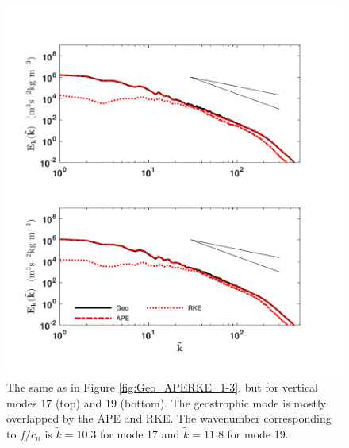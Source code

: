 \begin{figure}[H]
\includegraphics[scale=1]{Chapter4/img/Geo_APERKE_17-19}
\caption{The same as in Figure \ref{fig:Geo_APERKE_1-3}, but for vertical modes 17 (top) and 19 (bottom). The geostrophic mode is mostly overlapped by the APE and RKE. The wavenumber corresponding to $f/c_n$ is $\tilde{k} = 10.3$ for mode 17 and $\tilde{k} = 11.8$ for mode 19.}
\label{fig:Geo_APERKE_17-19}
\end{figure}

